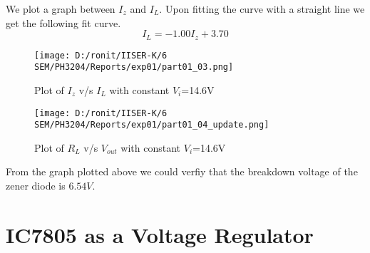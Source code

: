 \documentclass[12pt]{article}
\begin{document}
\noindent
We plot a graph between $I_z$ and $I_L$. Upon fitting the curve with a straight line we get the following fit curve.
\begin{equation*}
	I_L = -1.00I_z + 3.70
\end{equation*}
\begin{figure}[H]  
	\centering  
	\texttt{[image: D:/ronit/IISER-K/6 SEM/PH3204/Reports/exp01/part01\_03.png]}  %
	\caption{Plot of $I_z$ v/s $I_L$ with constant $V_i$=14.6V}  %
	\label{fig:part01_01}  %
  \end{figure}
  \begin{figure}[H]  
	\centering  
	\texttt{[image: D:/ronit/IISER-K/6 SEM/PH3204/Reports/exp01/part01\_04\_update.png]}  %
	\caption{Plot of $R_L$ v/s $V_{out}$ with constant $V_i$=14.6V}  %
	\label{fig:part01_01}  %
  \end{figure}\noindent
From the graph plotted above we could verfiy that the breakdown voltage of the zener diode is $6.54 V$.
\section{IC7805 as a Voltage Regulator}
\end{document}
